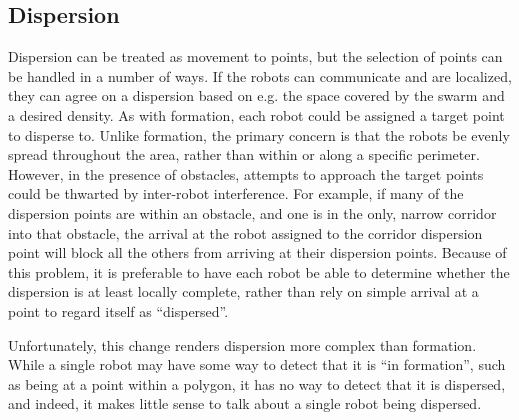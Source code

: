 \subsection{Dispersion}

Dispersion can be treated as movement to points, but the selection of points can be handled in a number of ways. 
If the robots can communicate and are localized, they can agree on a dispersion based on e.g. the space covered by the swarm and a desired density. 
As with formation, each robot could be assigned a target point to disperse to.
Unlike formation, the primary concern is that the robots be evenly spread throughout the area, rather than within or along a specific perimeter. 
However, in the presence of obstacles, attempts to approach the target points could be thwarted by inter-robot interference. 
For example, if many of the dispersion points are within an obstacle, and one is in the only, narrow corridor into that obstacle, the arrival at the robot assigned to the corridor dispersion point will block all the others from arriving at their dispersion points. 
Because of this problem, it is preferable to have each robot be able to determine whether the dispersion is at least locally complete, rather than rely on simple arrival at a point to regard itself as ``dispersed''.

Unfortunately, this change renders dispersion more complex than formation. 
While a single robot may have some way to detect that it is ``in formation'', such as being at a point within a polygon, it has no way to detect that it is dispersed, and indeed, it makes little sense to talk about a single robot being dispersed. 

